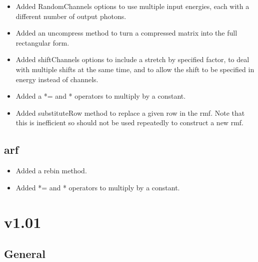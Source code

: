 \documentclass[11pt]{book}
\begin{document}
\begin{itemize}

\item Added RandomChannels options to use multiple input energies,
  each with a different number of output photons.

\item Added an uncompress method to turn a compressed matrix into the
  full rectangular form.

\item Added shiftChannels options to include a stretch by specified
  factor, to deal with multiple shifts at the same time, and to allow
  the shift to be specified in energy instead of channels.

\item Added a *= and * operators to multiply by a constant.

\item Added substituteRow method to replace a given row in the
  rmf. Note that this is inefficient so should not be used repeatedly
  to construct a new rmf.

\end{itemize}

\subsection{arf}

\begin{itemize}

\item Added a rebin method.

\item Added *= and * operators to multiply by a constant.

\end{itemize}

\section{v1.01}

\subsection{General}
\end{document}
